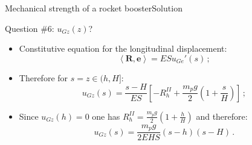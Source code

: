 \documentclass{beamer}
\newcommand{\uj}{u}
\newcommand{\zj}{z}
\newcommand{\ej}{e}
\newcommand{\ev}{{\boldsymbol\ej}}
\newcommand{\Rj}{R}
\newcommand{\Fresj}{R}
\newcommand{\Fres}{{\boldsymbol\Fresj}}
\newcommand{\scal}[1]{\left\langle{#1}\right\rangle}
\begin{document}
\begin{frame}{Mechanical strength of a rocket booster}{Solution}
\begin{overprint}
\vskip-20pt
\begin{exampleblock}{Question \#6: $\uj_{G\zj}(\zj)$?}
\begin{itemize}
\item Constitutive equation for the longitudinal displacement:
\begin{displaymath}
\scal{\Fres,\ev}=ES\uj_{Ge}'(s)\,;
\end{displaymath}
\item Therefore for $s=\zj\in(h,H]$:
\begin{displaymath}
\uj_{G\zj}(s)=\frac{s-H}{ES}\left[-\Rj_h^{II}+\frac{m_pg}{2}\left(1+\frac{s}{H}\right)\right]\,;
\end{displaymath}
\item Since $\uj_{G\zj}(h)=0$ one has $\Rj_h^{II}=\frac{m_pg}{2}(1+\frac{h}{H})$ and therefore:
\begin{displaymath}
\uj_{G\zj}(s)=\frac{m_p g}{2EHS}(s-h)(s-H)\,.
\end{displaymath}
\end{itemize}
\end{exampleblock}

\end{overprint}

\end{frame}
\end{document}
